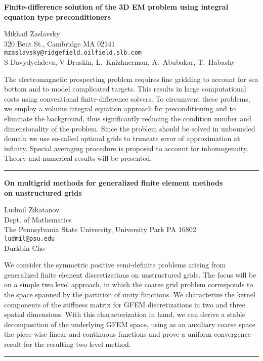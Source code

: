 \documentclass[twosided]{report}
\begin{document}
\begin{center}
{\large			%
{\bf Finite-difference solution of the 3D EM problem
using integral equation type preconditioners}}

	Mikhail Zaslavsky \\
	320 Bent St., Cambridge MA 02141 \\
	{\tt mzaslavsky@ridgefield.oilfield.slb.com} \\
	S Davydychdeva, V Druskin,
	L.~Knizhnerman, A.~Abubakar, T.~Habashy
\end{center}
The electromagnetic prospecting problem requires fine
gridding to account for sea bottom and to model complicated
targets. This results in large computational costs using
conventional finite-difference solvers. To circumvent these
problems, we employ a volume integral equation approach for
preconditioning and to eliminate the background, thus
significantly reducing the condition number and
dimensionality of the problem. Since the problem should be
solved in unbounded domain we use so-called optimal grids to
truncate error of approximation at infinity. Special
averaging procedure is proposed to account for
inhomogenuity. Theory and numerical results will be
presented.


	\begin{center} \rule{6in}{1pt} \end{center}

\begin{center}
{\large			%
{\bf On multigrid methods for generalized finite element methods \\
	on unstructured grids}}

	Ludmil Zikatanov \\
	Dept. of Mathematics \\
	The Pennsylvania State University, University Park PA 16802 \\
	{\tt ludmil@psu.edu} \\
	Durkbin Cho
\end{center}
We consider the symmetric positive semi-definite problems
arising from generalized finite element discretizations on
unstructured grids. The focus will be on a simple two level
approach, in which the coarse grid problem corresponds to
the space spanned by the partition of unity functions. We
characterize the kernel components of the stiffness matrix
for GFEM discretizations in two and three spatial
dimensions. With this characterization in hand, we can
derive a stable decomposition of the underlying GFEM space,
using as an auxiliary coarse space the piece-wise linear and
continuous functions and prove a uniform convergence result
for the resulting two level method.



	\begin{center} \rule{6in}{1pt} \end{center}

\end{document}

